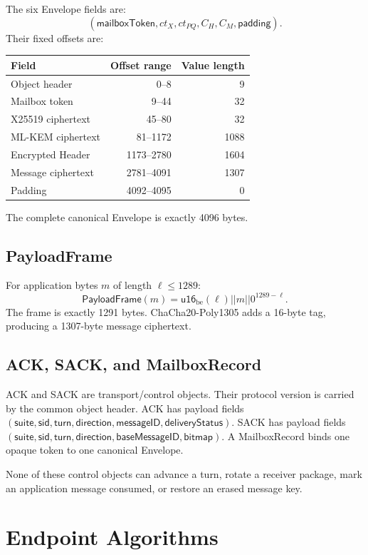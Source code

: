\documentclass[11pt,letterpaper]{article}
\begin{document}
The six Envelope fields are:
\[
  (\mathsf{mailboxToken},ct_X,ct_{PQ},C_H,C_M,\mathsf{padding}).
\]
Their fixed offsets are:
\begin{center}
\begin{tabular}{lrr}
\toprule
Field & Offset range & Value length \\
\midrule
Object header & 0--8 & 9 \\
Mailbox token & 9--44 & 32 \\
X25519 ciphertext & 45--80 & 32 \\
ML-KEM ciphertext & 81--1172 & 1088 \\
Encrypted Header & 1173--2780 & 1604 \\
Message ciphertext & 2781--4091 & 1307 \\
Padding & 4092--4095 & 0 \\
\bottomrule
\end{tabular}
\end{center}
The complete canonical Envelope is exactly 4096 bytes.

\subsection{PayloadFrame}

For application bytes $m$ of length $\ell \leq 1289$:
\[
  \mathsf{PayloadFrame}(m)=\mathsf{u16}_{\mathrm{be}}(\ell)\mathbin{||}m\mathbin{||}0^{1289-\ell}.
\]
The frame is exactly 1291 bytes. ChaCha20-Poly1305 adds a 16-byte tag, producing a
1307-byte message ciphertext.

\subsection{ACK, SACK, and MailboxRecord}

ACK and SACK are transport/control objects. Their protocol version is carried by the
common object header. ACK has payload fields $(\mathsf{suite},\mathsf{sid},\mathsf{turn},
\mathsf{direction},\mathsf{messageID},\mathsf{deliveryStatus})$. SACK has payload fields
$(\mathsf{suite},\mathsf{sid},\mathsf{turn},\mathsf{direction},\mathsf{baseMessageID},
\mathsf{bitmap})$. A MailboxRecord binds one opaque token to one canonical Envelope.

None of these control objects can advance a turn, rotate a receiver package, mark an
application message consumed, or restore an erased message key.

\section{Endpoint Algorithms}
\label{sec:algorithms}
\end{document}
